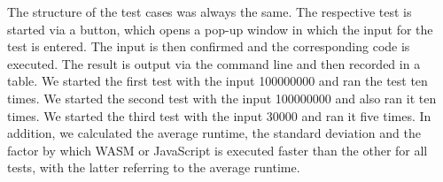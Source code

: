 The structure of the test cases was always the same. The respective test is started via a button, which opens a pop-up window in which the input for the test is entered. The input is then confirmed and the corresponding code is executed. The result is output via the command line and then recorded in a table.
We started the first test with the input 100000000 and ran the test ten times.
We started the second test with the input 100000000 and also ran it ten times.
We started the third test with the input 30000 and ran it five times.
In addition, we calculated the average runtime, the standard deviation and the factor by which WASM or JavaScript is executed faster than the other for all tests, with the latter referring to the average runtime.
